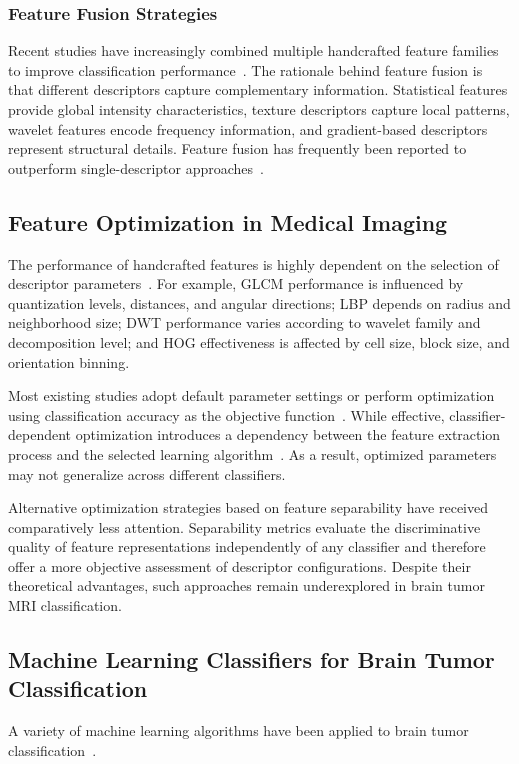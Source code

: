 \subsubsection{Feature Fusion Strategies}
Recent studies have increasingly combined multiple handcrafted feature families
to improve classification performance~\cite{pattanaik2022,dheepak2024,nawaz2022}.
The rationale behind feature fusion is that different descriptors capture
complementary information. Statistical features provide global intensity
characteristics, texture descriptors capture local patterns, wavelet features
encode frequency information, and gradient-based descriptors represent
structural details. Feature fusion has frequently been reported to outperform
single-descriptor approaches~\cite{pattanaik2022,nawaz2022}.

\subsection{Feature Optimization in Medical Imaging}
\label{sec:rw_optimization}
The performance of handcrafted features is highly dependent on the selection of
descriptor parameters~\cite{shukla2025}. For example, GLCM performance is
influenced by quantization levels, distances, and angular directions; LBP
depends on radius and neighborhood size; DWT performance varies according to
wavelet family and decomposition level; and HOG effectiveness is affected by
cell size, block size, and orientation binning.

Most existing studies adopt default parameter settings or perform optimization
using classification accuracy as the objective
function~\cite{nawaz2022,tseng2023,basthikodi2024}. While effective,
classifier-dependent optimization introduces a dependency between the feature
extraction process and the selected learning algorithm~\cite{tseng2023,nawaz2022}.
As a result, optimized parameters may not generalize across different
classifiers.

Alternative optimization strategies based on feature separability have received
comparatively less attention. Separability metrics evaluate the discriminative
quality of feature representations independently of any classifier and therefore
offer a more objective assessment of descriptor configurations. Despite their
theoretical advantages, such approaches remain underexplored in brain tumor MRI
classification.

\subsection{Machine Learning Classifiers for Brain Tumor Classification}
\label{sec:rw_benchmarking}
A variety of machine learning algorithms have been applied to brain tumor
classification~\cite{kumar2024,boateng2020}.

